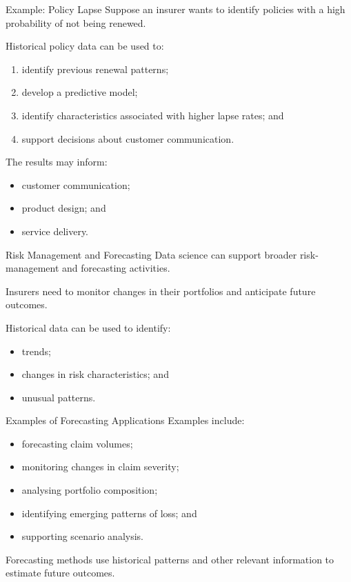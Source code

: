 \documentclass[
  ignorenonframetext,
  aspectratio=169,
]{beamer}
\providecommand{\tightlist}{%
  \setlength{\itemsep}{0pt}\setlength{\parskip}{0pt}}
\begin{document}
\begin{frame}{Example: Policy Lapse}
\protect{}\label{example-policy-lapse}
Suppose an insurer wants to identify policies with a high probability of
not being renewed.

Historical policy data can be used to:

\begin{enumerate}
\tightlist
\item
  identify previous renewal patterns;
\item
  develop a predictive model;
\item
  identify characteristics associated with higher lapse rates; and
\item
  support decisions about customer communication.
\end{enumerate}

The results may inform:

\begin{itemize}
\tightlist
\item
  customer communication;
\item
  product design; and
\item
  service delivery.
\end{itemize}
\end{frame}

\begin{frame}{Risk Management and Forecasting}
\protect{}\label{risk-management-and-forecasting}
Data science can support broader risk-management and forecasting
activities.

Insurers need to monitor changes in their portfolios and anticipate
future outcomes.

Historical data can be used to identify:

\begin{itemize}
\tightlist
\item
  trends;
\item
  changes in risk characteristics; and
\item
  unusual patterns.
\end{itemize}
\end{frame}

\begin{frame}{Examples of Forecasting Applications}
\protect{}\label{examples-of-forecasting-applications}
Examples include:

\begin{itemize}
\tightlist
\item
  forecasting claim volumes;
\item
  monitoring changes in claim severity;
\item
  analysing portfolio composition;
\item
  identifying emerging patterns of loss; and
\item
  supporting scenario analysis.
\end{itemize}

Forecasting methods use historical patterns and other relevant
information to estimate future outcomes.
\end{frame}
\end{document}
